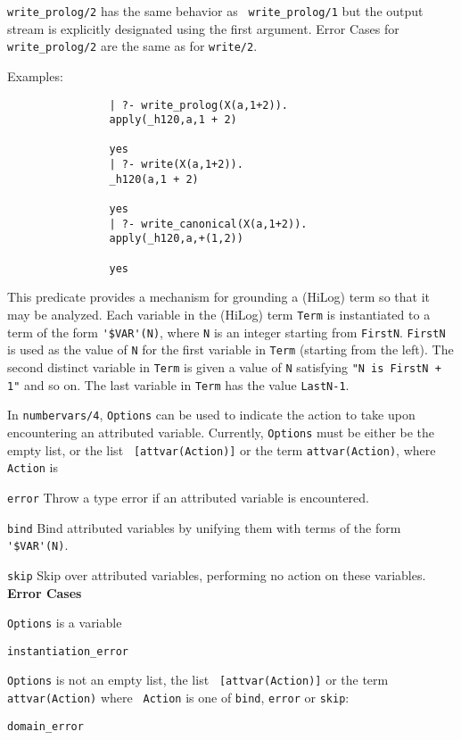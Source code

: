 \begin{description}
   {\tt write\_prolog/2} has the same behavior as {\tt
     write\_prolog/1} but the output stream is explicitly designated
   using the first argument.  Error Cases for {\tt write\_prolog/2}
   are the same as for {\tt write/2}.

    Examples:
    {\footnotesize
     \begin{verbatim}
                | ?- write_prolog(X(a,1+2)).
                apply(_h120,a,1 + 2)

                yes
                | ?- write(X(a,1+2)).
                _h120(a,1 + 2)

                yes
                | ?- write_canonical(X(a,1+2)).
                apply(_h120,a,+(1,2))

                yes
     \end{verbatim}}


%
This predicate provides a mechanism for grounding a (HiLog) term so
that it may be analyzed.  Each variable in the (HiLog) term {\tt Term}
is instantiated to a term of the form \verb|'$VAR'(N)|, where {\tt N}
is an integer starting from {\tt FirstN}.  {\tt FirstN} is used as the
value of {\tt N} for the first variable in {\tt Term} (starting from
the left). The second distinct variable in {\tt Term} is given a value
of {\tt N} satisfying {\tt "N is FirstN + 1"} and so on.  The last
variable in {\tt Term} has the value {\tt LastN-1}.

In {\tt numbervars/4}, {\tt Options} can be used to indicate the
action to take upon encountering an attributed variable.  Currently,
{\tt Options} must be either be the empty list, or the list {\tt
  [attvar(Action)]} or the term {\tt attvar(Action)}, where {\tt
  Action} is 
\bi
\item {\tt error} Throw a type error if an attributed variable is
  encountered.
\item {\tt bind} Bind attributed variables by unifying them with terms
  of the form \verb|'$VAR'(N)|.
\item {\tt skip} Skip over attributed variables, performing no action
  on these variables.
\ei
{\bf Error Cases}
\bi
\item 	{\tt Options} is a variable
\bi
\item {\tt instantiation\_error}
\ei
\item {\tt Options} is not an empty list, the list {\tt
  [attvar(Action)]} or the term {\tt attvar(Action)} where {\tt
  Action} is one of {\tt bind}, {\tt error} or {\tt skip}:
 \bi
\item 	{\tt domain\_error}
\ei
\ei


\end{description}
